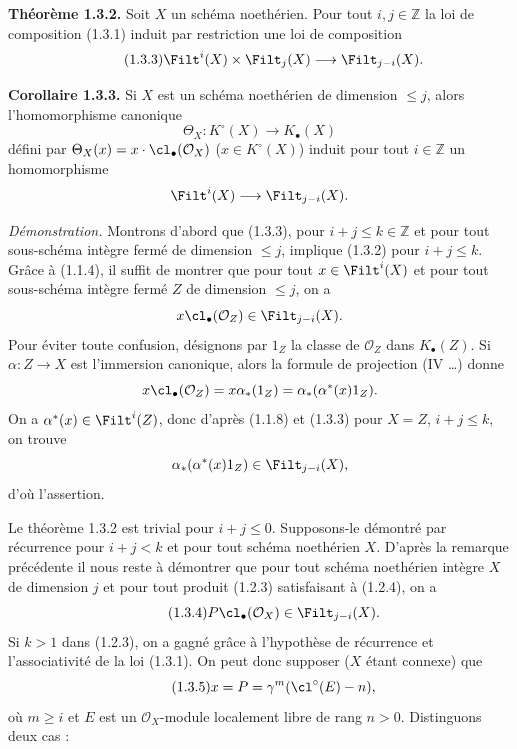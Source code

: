 \textbf{Théorème 1.3.2.} Soit $X$ un schéma noethérien. Pour tout $i,j\in\mathbb Z$ la loi de composition (1.3.1) induit par restriction une loi de composition
\begin{equation}\tag{1.3.3}
\Filt^i(X)\times\Filt_j(X)\longrightarrow\Filt_{j-i}(X).
\end{equation}

\textbf{Corollaire 1.3.3.} Si $X$ est un schéma noethérien de dimension $\leq j$, alors l'homomorphisme canonique
\[
\Theta_X:K^\circ(X)\longrightarrow K_\bullet(X)
\]
défini par $\Theta_X(x)=x\cdot\cl_\bullet(\mathcal O_X)$ ($x\in K^\circ(X)$) induit pour tout $i\in\mathbb Z$ un homomorphisme
\[
\Filt^i(X)\longrightarrow\Filt_{j-i}(X).
\]

\emph{Démonstration.} Montrons d'abord que (1.3.3), pour $i+j\leq k\in\mathbb Z$ et pour tout sous-schéma intègre fermé de dimension $\leq j$, implique (1.3.2) pour $i+j\leq k$. Grâce à (1.1.4), il suffit de montrer que pour tout $x\in\Filt^i(X)$ et pour tout sous-schéma intègre fermé $Z$ de dimension $\leq j$, on a
\[
x\cl_\bullet(\mathcal O_Z)\in\Filt_{j-i}(X).
\]
Pour éviter toute confusion, désignons par $1_Z$ la classe de $\mathcal O_Z$ dans $K_\bullet(Z)$. Si $\alpha:Z\to X$ est l'immersion canonique, alors la formule de projection (IV \ldots) donne
\[
x\cl_\bullet(\mathcal O_Z)=x\alpha_*(1_Z)=\alpha_*(\alpha^*(x)1_Z).
\]
On a $\alpha^*(x)\in\Filt^i(Z)$, donc d'après (1.1.8) et (1.3.3) pour $X=Z$, $i+j\leq k$, on trouve
\[
\alpha_*(\alpha^*(x)1_Z)\in\Filt_{j-i}(X),
\]
d'où l'assertion.

Le théorème 1.3.2 est trivial pour $i+j\leq0$. Supposons-le démontré par récurrence pour $i+j<k$ et pour tout schéma noethérien $X$. D'après la remarque précédente il nous reste à démontrer que pour tout schéma noethérien intègre $X$ de dimension $j$ et pour tout produit (1.2.3) satisfaisant à (1.2.4), on a
\begin{equation}\tag{1.3.4}
P\cl_\bullet(\mathcal O_X)\in\Filt_{j-i}(X).
\end{equation}
Si $k>1$ dans (1.2.3), on a gagné grâce à l'hypothèse de récurrence et l'associativité de la loi (1.3.1). On peut donc supposer ($X$ étant connexe) que
\begin{equation}\tag{1.3.5}
x=P=\gamma^m(\cl^\circ(E)-n),
\end{equation}
où $m\geq i$ et $E$ est un $\mathcal O_X$-module localement libre de rang $n>0$. Distinguons deux cas :

